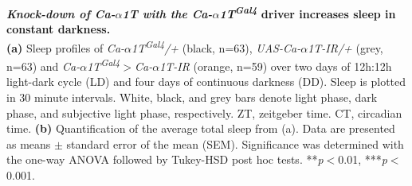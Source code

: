\label{fig:S4}
\textbf{\emph{Knock-down of Ca-$\alpha$1T with the \emph{Ca-$\alpha$1T\textsuperscript{Gal4}}} driver increases sleep in constant darkness.}
\\
\textbf{(a)} Sleep profiles of \emph{Ca-$\alpha$1T\textsuperscript{Gal4}/+} (black, n=63), \emph{UAS-Ca-$\alpha$1T-IR/+} (grey, n=63) and \emph{Ca-$\alpha$1T\textsuperscript{Gal4}$>$Ca-$\alpha$1T-IR} (orange, n=59) over two days of 12h:12h light-dark cycle (LD) and four days of continuous darkness (DD).
Sleep is plotted in 30 minute intervals.
White, black, and grey bars denote light phase, dark phase, and subjective light phase, respectively.
ZT, zeitgeber time.
CT, circadian time.
\textbf{(b)} Quantification of the average total sleep from (a).
Data are presented as means $\pm$ standard error of the mean (SEM).
Significance was determined with the one-way ANOVA followed by Tukey-HSD post hoc tests.
**\emph{p}$<$0.01, ***\emph{p}$<$0.001.
